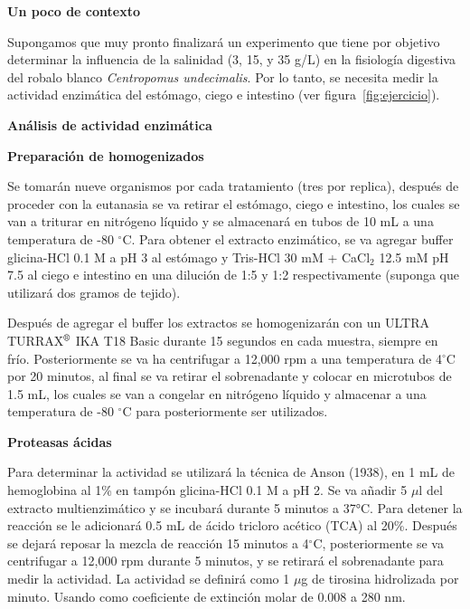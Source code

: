 \documentclass[12pt,a4paper]{article}
\newcommand{\sect}[1]{
	\begin{tcolorbox}[colframe= white,top=2pt, bottom=2pt, colback = gris]
	 \textbf{#1} %
    \end{tcolorbox}
 }
\begin{document}
\begin{multicols}{2}

    \raggedcolumns
    
\sect{Un poco de contexto}

Supongamos que muy pronto finalizar\'a un experimento que tiene por objetivo determinar la influencia de la salinidad (3, 15, y 35 g/L) en la fisiolog\'ia digestiva del robalo blanco \textit{Centropomus undecimalis}. Por lo tanto, se necesita medir la actividad enzim\'atica del est\'omago, ciego e intestino (ver figura~\ref{fig:ejercicio}). 

\sect{An\'alisis de actividad enzim\'atica}

\begin{Exercice}\textbf{ Preparaci\'on de homogenizados}

	Se tomar\'an nueve organismos por cada tratamiento (tres por replica), después de proceder con la eutanasia se va retirar el est\'omago, ciego e intestino, los cuales se van a triturar en nitr\'ogeno l\'iquido y se almacenar\'a en tubos de 10 mL a una temperatura de -80 $^\circ$C. Para obtener el extracto enzim\'atico, se va agregar buffer glicina-HCl 0.1 M a pH 3 al estómago y Tris-HCl 30 mM + CaCl$_2$ 12.5 mM pH 7.5 al ciego e intestino en una dilución de 1:5 y 1:2 respectivamente (suponga que utilizar\'a dos gramos de tejido).
	
	Despu\'es de agregar el buffer los extractos se homogenizar\'an con un ULTRA TURRAX$^{\mbox{\scriptsize\textregistered}}$  IKA T18 Basic durante 15 segundos en cada muestra, siempre en frío. Posteriormente se va ha centrifugar a 12,000 rpm a una temperatura de 4$^\circ$C por 20 minutos, al final se va retirar el sobrenadante y colocar en microtubos de 1.5 mL, los cuales se van a congelar en nitrógeno líquido y almacenar a una temperatura de -80 $^\circ$C para posteriormente ser utilizados. 
	
\end{Exercice}
    
\begin{Exercice} \textbf{Proteasas ácidas}
	
	Para determinar la actividad se utilizar\'a la técnica de Anson (1938), en 1 mL de hemoglobina al 1\% en tampón glicina-HCl 0.1 M a pH 2. Se va a\~nadir 5 $\mu$l del extracto multienzimático y se incubar\'a durante 5 minutos a 37°C. Para detener la reacción se le adicionar\'a 0.5 mL de ácido tricloro acético (TCA) al 20\%. Después se dejar\'a reposar la mezcla de reacción 15 minutos a 4$^\circ$C, posteriormente se va centrifugar a 12,000 rpm durante 5 minutos, y se retirar\'a el sobrenadante para medir la actividad. La actividad se definir\'a como 1 $\mu$g de tirosina hidrolizada por minuto. Usando como coeficiente de extinción molar de 0.008 a 280 nm.


\end{Exercice}
\end{multicols}
\end{document}
